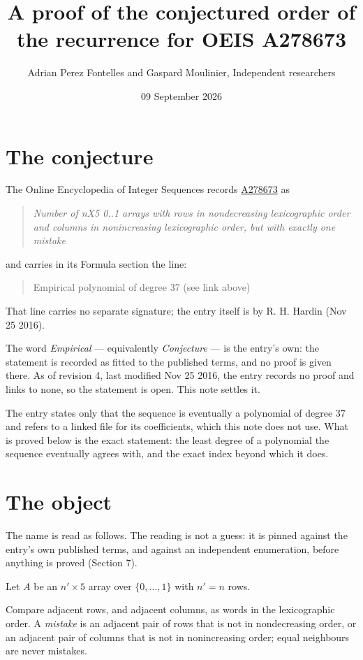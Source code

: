 \documentclass[11pt]{article}
\title{A proof of the conjectured order of the recurrence for OEIS A278673}
\author{Adrian Perez Fontelles and Gaspard Moulinier, Independent researchers}
\date{09 September 2026}
\theoremstyle{definition}
\begin{document}
\maketitle
\section{The conjecture}

The Online Encyclopedia of Integer Sequences records \href{https://oeis.org/A278673}{A278673} as

\begin{quote}\itshape Number of nX5 0..1 arrays with rows in nondecreasing lexicographic order and columns in nonincreasing lexicographic order, but with exactly one mistake\end{quote}

and carries in its Formula section the line:

\begin{quote}\ttfamily Empirical polynomial of degree 37 (see link above)\end{quote}

That line carries no separate signature; the entry itself is by R. H. Hardin (Nov 25 2016).

The word {\itshape Empirical} --- equivalently {\itshape Conjecture} --- is the entry's own: the statement is recorded as fitted to the published terms, and no proof is given there. As of revision 4, last modified Nov 25 2016, the entry records no proof and links to none, so the statement is open. This note settles it.

The entry states only that the sequence is eventually a polynomial of degree $37$ and refers to a linked file for its coefficients, which this note does not use. What is proved below is the exact statement: the least degree of a polynomial the sequence eventually agrees with, and the exact index beyond which it does.

\section{The object}

The name is read as follows. The reading is not a guess: it is pinned against the entry's own published terms, and against an independent enumeration, before anything is proved (Section 7).

Let $A$ be an $n' \times 5$ array over $\{0,\dots,1\}$ with $n' = n$ rows.

Compare adjacent rows, and adjacent columns, as words in the lexicographic order. A {\itshape mistake} is an adjacent pair of rows that is not in nondecreasing order, or an adjacent pair of columns that is not in nonincreasing order; equal neighbours are never mistakes.
\end{document}
